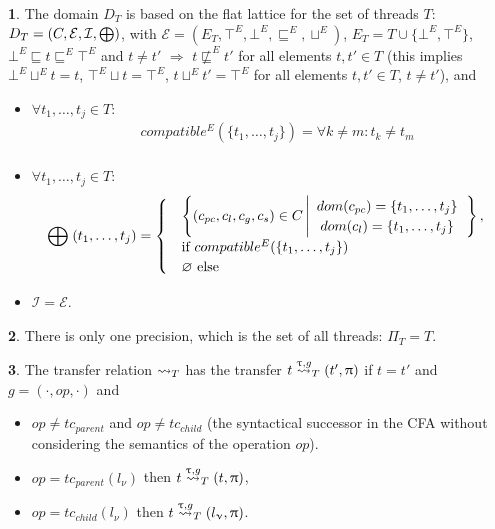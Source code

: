 {\textbf 1.} The domain $D_T$ is based on the flat lattice for the set of threads $T$: 
$D_T = (C, \mathcal{E}, \mathcal{I}, \mathrel{\bigoplus})$, with $\mathcal{E}=(E_T, \top^E, \bot^E, \sqsubseteq^E, \sqcup^E)$, $E_T=T \cup \{\bot^E,\top^E\}$, $\bot^E \sqsubseteq t \sqsubseteq^E \top^E$ and $t \neq t'$ $\Rightarrow$ $t \not\sqsubseteq^E t'$ for all elements $t, t'\in T$ 
(this implies $\bot^E \sqcup^E t = t$, $\top^E \sqcup t = \top^E$, $t \sqcup^E t' = \top^E$ for all elements $t,t'\in T$, $t\neq t'$), 
and 
\begin{itemize}
\item $\forall t_1, \dots, t_j \in T:$
\begin{equation}
\begin{aligned}
& compatible^E(\{t_1,\dots, t_j\}) = \forall k\ne m: t_k\ne t_m\\
\end{aligned}
\end{equation}

\item $\forall t_1, \dots, t_j \in T:$
\begin{equation}
\begin{aligned}
& \mathrel{\bigoplus}(t_1,\dots,t_j) = 
\begin{cases}
& \left\lbrace (c_{pc},c_l,c_g,c_s) \in C 
\left| 
\begin{array}{c}
dom(c_{pc}) = \{t_1, \dots, t_j\}\\
dom(c_l) = \{t_1, \dots, t_j\}\\
\end{array}
\right.
\right\rbrace, \\
& \mbox{if } compatible^E(\{t_1,\dots, t_j\})\\
& \varnothing \mbox{ else}
\end{cases}
\end{aligned}
\end{equation}

\item $\mathcal{I}=\mathcal{E}$. 
\end{itemize}

{\textbf 2.} There is only one precision, which is the set of all threads: $\Pi_T = T$.

{\textbf 3.} The transfer relation $\leadsto_T$ has the transfer $t \stackrel{\uptau, g}{\leadsto}_T (t', \uppi)$ if $t=t'$ and $g=(\cdot,op,\cdot)$ and 
\begin{itemize}
\item $op \neq tc_{parent}$ and $op\neq tc_{child}$ (the syntactical successor in the CFA without considering the semantics of the operation $op$). 
\item $op=tc_{parent}(l_\nu)$ then $t \stackrel{\uptau, g}{\leadsto}_T (t, \uppi)$,
\item $op=tc_{child}(l_\nu)$ then $t \stackrel{\uptau, g}{\leadsto}_T (l_\upnu, \uppi)$.
\end{itemize}

